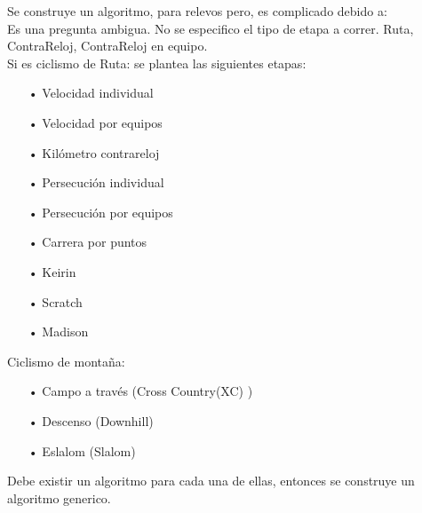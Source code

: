 \documentclass[english]{article}
\begin{document}
Se construye un algoritmo, para relevos pero, es complicado debido a:\\
Es una pregunta ambigua. No se especifico el tipo de etapa a correr. Ruta, ContraReloj, ContraReloj en equipo.\\
Si es ciclismo de Ruta: se plantea las siguientes etapas:
\begin{itemize}
\item[•]Velocidad individual
\item[•]Velocidad por equipos
\item[•]Kilómetro contrareloj
\item[•]Persecución individual
\item[•]Persecución por equipos
\item[•]Carrera por puntos
\item[•]Keirin
\item[•]Scratch
\item[•]Madison
\end{itemize}
Ciclismo de montaña:
\begin{itemize}
\item[•]Campo a través (Cross Country(XC) )
\item[•]Descenso (Downhill)
\item[•]Eslalom (Slalom)
\end{itemize}
Debe existir un algoritmo para cada una de ellas, entonces se construye un algoritmo generico.
\printbibliography
\end{document}
